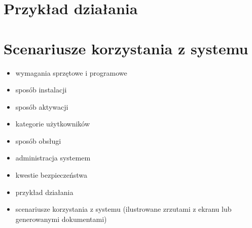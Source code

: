 \section{Przykład działania}


\section{Scenariusze korzystania z systemu}


\begin{itemize}
\item  wymagania sprzętowe i programowe
\item  sposób instalacji
\item  sposób aktywacji
\item  kategorie użytkowników
\item  sposób obsługi
\item  administracja systemem
\item  kwestie bezpieczeństwa
\item  przykład działania
\item  scenariusze korzystania z systemu (ilustrowane zrzutami z ekranu lub generowanymi dokumentami)
\end{itemize}
\



%
%
%
%
%        


